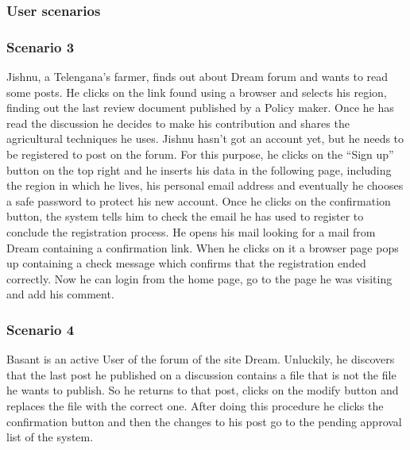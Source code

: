 \subsubsection{User scenarios}
\subsubsection*{Scenario 3}
Jishnu, a Telengana’s farmer, finds out about Dream forum and wants to read some posts. He clicks on the link found using a browser and selects his region, finding out the last review document published by a Policy maker. Once he has read the discussion he decides to make his contribution and shares the agricultural techniques he uses.
Jishnu hasn’t got an account yet, but he needs to be registered to post on the forum. For this purpose, he clicks on the “Sign up” button on the top right and he inserts his data in the following page, including the region in which he lives, his personal email address and eventually he chooses a safe password to protect his new account. Once he clicks on the confirmation button, the system tells him to check the email he has used to register to conclude the registration process. He opens his mail looking for a mail from Dream containing a confirmation link. When he clicks on it a browser page pops up containing a check message which confirms that the registration ended correctly. Now he can login from the home page, go to the page he was visiting and add his comment.

\subsubsection*{Scenario 4}
Basant is an active User of the forum of the site Dream. Unluckily, he discovers that the last post he published on a discussion contains a file that is not the file he wants to publish. So he returns to that post, clicks on the modify button and replaces the file with the correct one. After doing this procedure he clicks the confirmation button and then the changes to his post go to the pending approval list of the system.

